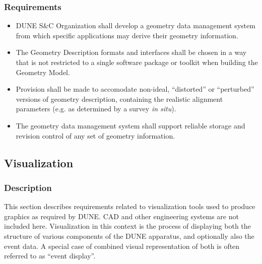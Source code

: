 \subsubsection{Requirements}
\begin{itemize}
	\item DUNE S\&C Organization shall develop a  geometry data management system from which specific applications may derive their geometry information.
	
	\item The Geometry Description formats and interfaces shall be chosen in a way that is not restricted to a single 
	software package or toolkit when building the Geometry Model.
	
	\item Provision shall be made to accomodate non-ideal, ``distorted'' or ``perturbed'' versions of geometry description, 
	containing the realistic alignment parameters (e.g. as determined by a survey \textit{in situ}).
	
	\item The geometry data management system shall support reliable storage and  revision control of any set of geometry information.
	
\end{itemize}

\newpage
\subsection{Visualization}
\subsubsection{Description}

This section describes requirements related to visualization tools used to produce graphics as required by DUNE. CAD and other engineering systems are not included here. Visualization in this context is the process of displaying both the structure of various components of the DUNE apparatus, and optionally also the event data. A special case of combined visual representation of both is often referred to as ``event display''.

